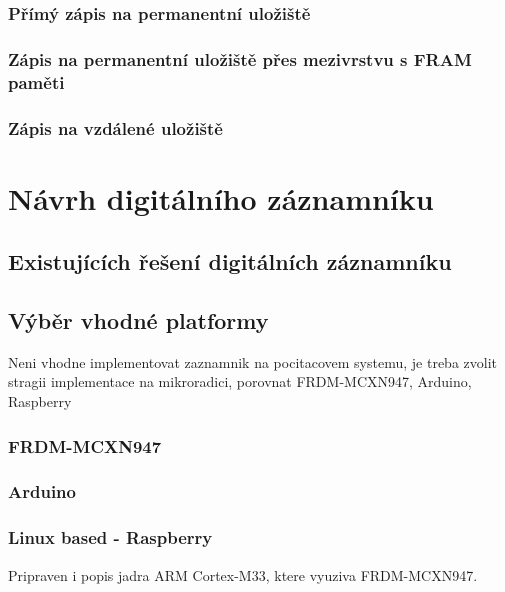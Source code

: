 \subsection{Přímý zápis na permanentní uložiště}

\subsection{Zápis na permanentní uložiště přes mezivrstvu s FRAM paměti}

\subsection{Zápis na vzdálené uložiště}

\chapter{Návrh digitálního záznamníku}


\section{Existujících řešení digitálních záznamníku}


\section{Výběr vhodné platformy}
Neni vhodne implementovat zaznamnik na pocitacovem systemu, je treba zvolit stragii implementace na mikroradici, porovnat FRDM-MCXN947, Arduino, Raspberry

\subsection{FRDM-MCXN947}

\subsection{Arduino}

\subsection{Linux based - Raspberry}

Pripraven i popis jadra ARM Cortex-M33, ktere vyuziva FRDM-MCXN947.

